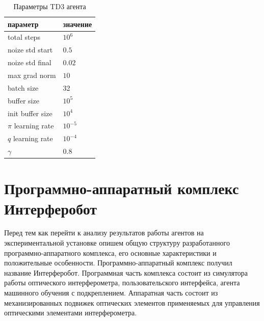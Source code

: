 \begin{table} [htbp]
    \centering
    \begin{threeparttable}%
        \caption{Параметры TD3 агента}\label{tab:td3_params}%
        \begin{tabular}{| p{5cm} || p{5cm} |}
            \hline
            \hline
            параметр & значение \\
            \hline
            total steps & $10^6$ \\
            noize std start & $0.5$ \\
            noize std final & $0.02$ \\
            max grad norm & $10$ \\
            batch size & 32 \\
            buffer size & $10^5$ \\
            init buffer size & $10^4$ \\
            $\pi$ learning rate & $10^{-5}$ \\
            $q$ learning rate & $10^{-4}$ \\
            $\gamma$ & 0.8 \\
            \hline
            \hline
        \end{tabular}
    \end{threeparttable}
\end{table}

\section{Программно-аппаратный комплекс Интерферобот}

Перед тем как перейти к анализу результатов работы агентов на экспериментальной установке опишем общую структуру разработанного программно-аппаратного комплекса, его основные характеристики и положительные особенности. Программно-аппаратный комплекс получил название Интерферобот. Программная часть комплекса состоит из симулятора работы оптического интерферометра, пользовательского интерфейса, агента машинного обучения с подкреплением. Аппаратная часть состоит из механизированных подвижек оптических элементов применяемых для управления оптическими элементами интерферометра. 

